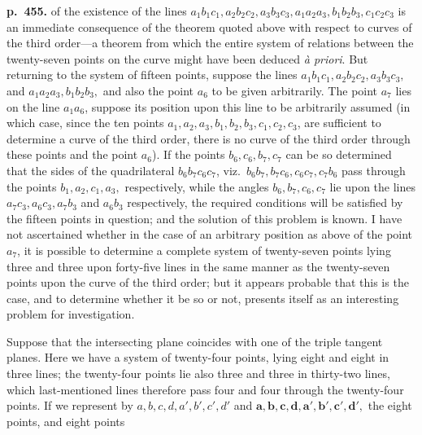 \documentclass[11pt]{article}
\begin{document}
\bigskip
\noindent\textbf{p.~455.} of the existence of the lines $a_1 b_1 c_1, a_2 b_2 c_2, a_3 b_3 c_3, a_1 a_2 a_3, b_1 b_2 b_3, c_1 c_2 c_3$ is an immediate consequence of the theorem quoted above with respect to curves of the third order---a theorem from which the entire system of relations between the twenty-seven points on the curve might have been deduced \textit{\`a priori}. But returning to the system of fifteen points, suppose the lines $a_1 b_1 c_1, a_2 b_2 c_2, a_3 b_3 c_3,$ and $a_1 a_2 a_3, b_1 b_2 b_3,$ and also the point $a_6$ to be given arbitrarily. The point $a_7$ lies on the line $a_1 a_6$, suppose its position upon this line to be arbitrarily assumed (in which case, since the ten points $a_1, a_2, a_3, b_1, b_2, b_3, c_1, c_2, c_3$, are sufficient to determine a curve of the third order, there is no curve of the third order through these points and the point $a_6$). If the points $b_6, c_6, b_7, c_7$ can be so determined that the sides of the quadrilateral $b_6 b_7 c_6 c_7$, viz.\ $b_6 b_7, b_7 c_6, c_6 c_7, c_7 b_6$ pass through the points $b_1, a_2, c_1, a_3,$ respectively, while the angles $b_6, b_7, c_6, c_7$ lie upon the lines $a_7 c_3, a_6 c_3, a_7 b_3$ and $a_6 b_3$ respectively, the required conditions will be satisfied by the fifteen points in question; and the solution of this problem is known. I have not ascertained whether in the case of an arbitrary position as above of the point $a_7$, it is possible to determine a complete system of twenty-seven points lying three and three upon forty-five lines in the same manner as the twenty-seven points upon the curve of the third order; but it appears probable that this is the case, and to determine whether it be so or not, presents itself as an interesting problem for investigation.

Suppose that the intersecting plane coincides with one of the triple tangent planes. Here we have a system of twenty-four points, lying eight and eight in three lines; the twenty-four points lie also three and three in thirty-two lines, which last-mentioned lines therefore pass four and four through the twenty-four points. If we represent by $a, b, c, d, a', b', c', d'$ and $\mathbf{a, b, c, d, a', b', c', d'},$ the eight points, and eight points
\end{document}
